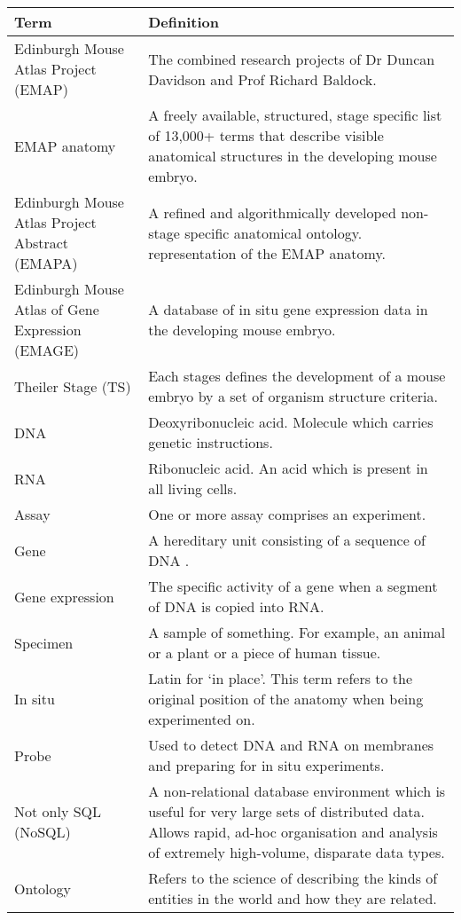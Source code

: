 \begin{center}
    \begin{tabular}{ |p{0.3\linewidth} | p{0.7\linewidth} |}
    \hline
    \textbf{Term} & \textbf{Definition} \\ \hline
    Edinburgh Mouse Atlas Project (EMAP) & The combined research projects of Dr Duncan Davidson and Prof Richard Baldock. \\ \hline
    EMAP anatomy & A freely available, structured, stage specific list of 13,000+ terms that describe visible anatomical structures in the developing mouse embryo. \\ \hline
    Edinburgh Mouse Atlas Project Abstract (EMAPA) & A refined and algorithmically developed non-stage specific anatomical ontology. representation of the EMAP anatomy. \\ \hline
    Edinburgh Mouse Atlas of Gene Expression (EMAGE) & A database of in situ gene expression data in the developing mouse embryo.  \\ \hline
    Theiler Stage (TS) & Each stages defines the development of a mouse embryo by a set of organism structure criteria. \\ \hline
    DNA & Deoxyribonucleic acid. Molecule which carries genetic instructions. \\ \hline
    RNA & Ribonucleic acid. An acid which is present in all living cells.  \\ \hline
    Assay & One or more assay comprises an experiment. \\ \hline
    Gene & A hereditary unit consisting of a sequence of DNA \cite{emap}. \\ \hline
    Gene expression & The specific activity of a gene when a segment of DNA is copied into RNA. \\ \hline
    Specimen &  A sample of something. For example, an animal or a plant or a piece of human tissue.\\ \hline
    In situ & Latin for `in place'. This term refers to the original position of the anatomy when being experimented on. \\ \hline
    Probe & Used to detect DNA and RNA on membranes and preparing for in situ experiments. \\ \hline
    Not only SQL (NoSQL) & A non-relational database environment which is useful for very large sets of distributed data. Allows rapid, ad-hoc organisation and analysis of extremely high-volume, disparate data types. \\ \hline
        Ontology & Refers to the science of describing the kinds of entities in the world and how they are related. \\ \hline
    \end{tabular}
\end{center}
